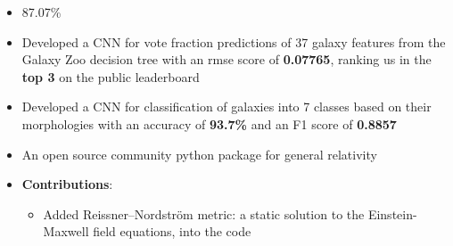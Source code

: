 \documentclass[10pt,a4paper,ragged2e,withhyper]{altacv}
\begin{document}
\begin{paracol}{2}
\begin{itemize}
    \item 87.07\%
\end{itemize}

\begin{comment}
\cvevent{Secondary School Certificate}{Boys' Town Public School}{2015}{Nashik}
\begin{itemize}
    \item 94.4\%
\end{itemize}
\end{comment}


    \begin{itemize}
        \item Developed a CNN for vote fraction predictions of 37 galaxy features from the Galaxy Zoo decision tree with an rmse score of \textbf{0.07765}, ranking us in the \textbf{top 3} on the public leaderboard
        \item Developed a CNN for classification of galaxies into 7 classes based on their morphologies with an accuracy of \textbf{93.7\%} and an F1 score of \textbf{0.8857}
    \end{itemize}
\begin{comment}
\cvsubsection{THE SCHRODPY PROJECT}
    \begin{itemize}
        \item The project is in early phases, which plans at providing an efficient simulation of quantum systems
        \item Applied various methods to numerically solve Schrödinger's Time Independent wave equation for finding stationary states of the particle in an Infinite Potential Well
        \item Prospects: An efficient and community python package for simulating quantum many-body systems using tensor networks
    \end{itemize}
\end{comment}
\begin{itemize}
    \item An open source community python package for general relativity
    \item \textbf{Contributions}:
    \begin{itemize}
        \item Added Reissner–Nordström metric: a static solution to the Einstein-Maxwell field equations, into the code %

\end{itemize}
\end{itemize}
\end{paracol}
\end{document}
